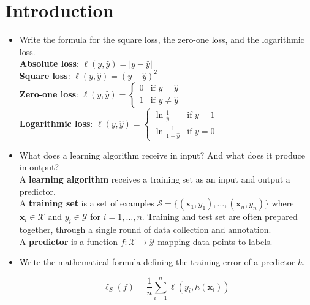 \newpage
\section{Introduction}


\begin{itemize}
    \item Write the formula for the square loss, the zero-one loss, and the logarithmic loss.\\

        \textbf{Absolute loss}: $\ell(y, \hat{y}) = |y-\hat{y}|$\\
        \textbf{Square loss}: $\ell(y, \hat{y}) = (y-\hat{y})^2$\\
        \textbf{Zero-one loss}: $\ell(y, \hat{y}) = \begin{cases} 
            0 & \text{if } y = \hat{y}\\ 
            1 & \text{if } y \neq \hat{y}
        \end{cases}$\\
        \textbf{Logarithmic loss}: $\ell(y, \hat{y}) = \begin{cases} 
            \ln\frac{1}{\hat{y}} & \text{if } y = 1\\ 
            \ln\frac{1}{1-\hat{y}} & \text{if } y = 0 
        \end{cases}$\\

    \item What does a learning algorithm receive in input? And what does it produce in output?\\

        A \textbf{learning algorithm} receives a training set as an input and output a predictor.\\ A \textbf{training set} is a set of examples $\mathcal{S} = \{(\boldsymbol{x}_1, y_1), \dots, (\boldsymbol{x}_n, y_n)\}$ where $\boldsymbol{x}_i \in \mathcal{X}$ and $y_i \in \mathcal{Y}$ for $i = 1, \dots, n$. Training and test set are often prepared together, through a single round of data collection and annotation.\\ A \textbf{predictor} is a function $f: \mathcal{X} \rightarrow \mathcal{Y}$ mapping data points to labels.\\
    
    \item Write the mathematical formula defining the training error of a predictor $h$.

        $$\ell_{S}(f) = \frac{1}{n} \sum_{i=1}^n \ell(y_i, h(\boldsymbol{x}_i))$$


\end{itemize}
